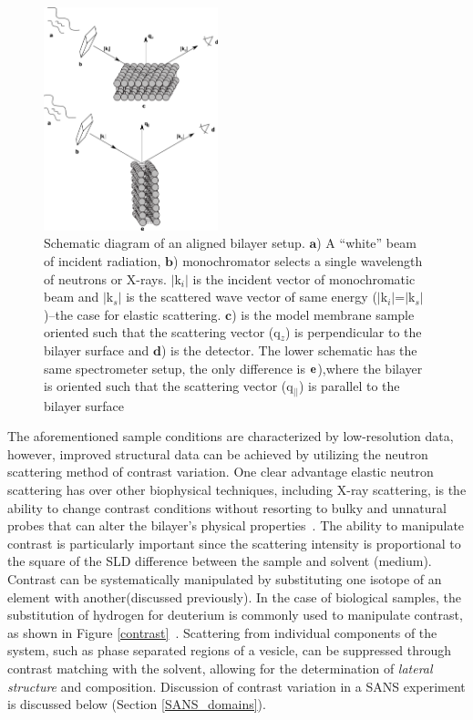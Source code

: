 \documentclass[8.5pt,twoside,twocolumn]{article}
\begin{document}
\begin{figure}
	\centering
	\includegraphics[width=0.45\textwidth]{figures/geometries3.png}
	\caption{Schematic diagram of an aligned bilayer setup. $\textbf{a}$) A ``white'' beam of incident radiation, $\textbf{b}$) monochromator selects a single wavelength of neutrons or X-rays. $|$k$_i$$|$ is the incident vector of monochromatic beam and $|$k$_s$$|$ is the scattered wave vector of same energy ($|$k$_i$$|$=$|$k$_s$$|$)--the case for elastic scattering. $\textbf{c}$) is the model membrane sample oriented such that the scattering vector (q$_z$) is perpendicular to the bilayer surface and $\textbf{d}$) is the detector. The lower schematic has the same spectrometer setup, the only difference is $\bf{e}$),where the bilayer is oriented such that the scattering vector (q$_{||}$) is parallel to the bilayer surface}
	\label{geo}
\end{figure}


The aforementioned sample conditions are characterized by low-resolution data, however, improved structural data can be achieved by utilizing the neutron scattering method of contrast variation.
One clear advantage elastic neutron scattering has over other biophysical techniques, including X-ray scattering, is the ability to change contrast conditions without resorting to bulky and unnatural probes that can alter the bilayer's physical properties~\cite{Marquardt.2014}. The ability to manipulate contrast is particularly important since the scattering intensity is proportional to the square of the SLD difference between the sample and solvent (medium).
Contrast can be systematically manipulated by substituting one isotope of an element with another(discussed previously). In the case of biological samples, the substitution of hydrogen for deuterium is commonly used to manipulate contrast, as shown in Figure \ref{contrast}~\cite{T.A.Harroun.2006}. Scattering from individual components of the system, such as phase separated regions of a vesicle, can be suppressed through contrast matching with the solvent, allowing for the determination of \emph{lateral structure} and composition. Discussion of contrast variation in a SANS experiment is discussed below (Section \ref{SANS_domains}).
\end{document}
